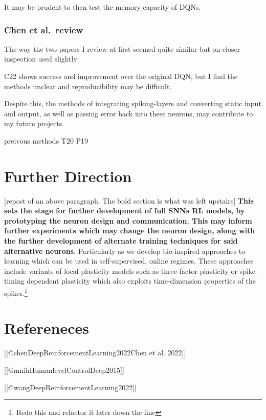 It may be prudent to then test the memory capacity of DQNs.

\hypertarget{chen-et-al.-review}{%
\subsubsection{Chen et al.~review}\label{chen-et-al.-review}}

The way the two papers I review at first seemed quite similar but on
closer inspection used slightly

C22 shows success and improvement over the original DQN, but I find the
methods unclear and reproducibility may be difficult.

Despite this, the methods of integrating spiking-layers and converting
static input and output, as well as passing error back into these
neurons, may contribute to my future projects.

preivous methods T20 P19

\hypertarget{further-direction}{%
\section{Further Direction}\label{further-direction}}

{[}repost of an above paragraph. The bold section is what was left
upstairs{]} \textbf{This sets the stage for further development of full
SNNs RL models, by prototyping the neuron design and communication. This
may inform further experiments which may change the neuron design, along
with the further development of alternate training techniques for said
alternative neurons}. Particularly as we develop bio-inspired approaches
to learning which can be used in self-supervised, online regimes. These
approaches include variants of local plasticity models such as
three-factor plasticity or spike-timing dependent plasticity which also
exploits time-dimension properties of the spikes.\footnote{Redo this and
  refactor it later down the line}

\hypertarget{refereneces}{%
\section{Refereneces}\label{refereneces}}

{[}{[}@chenDeepReinforcementLearning2022\textbar Chen et al. 2022{]}{]}

{[}{[}@mnihHumanlevelControlDeep2015{]}{]}

{[}{[}@wangDeepReinforcementLearning2022{]}{]}

